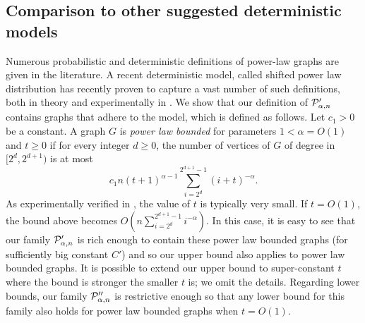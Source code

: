 \subsection{Comparison to other suggested deterministic models}
Numerous probabilistic and  deterministic  definitions of power-law graphs are given in the literature.
A recent deterministic model, called  shifted power law distribution \cite{eom2011characterizing} has recently proven to capture a vast number of such definitions, both in theory and experimentally in \cite{Sankowski2016PowerLaw}.
We show that our definition of $ \mathcal{P}'_{\alpha,n}$ contains graphs that adhere to the model, which is defined as follows.
 Let $c_1 > 0$ be a constant. A graph $G$ is \emph{power law bounded} for parameters $1 < \alpha = O(1)$ and $t\geq 0$ if for every integer $d\geq 0$, the number of vertices of $G$ of degree in $[2^d,2^{d+1})$ is at most
\[
  c_1n(t+1)^{\alpha - 1}\sum_{i = 2^d}^{2^{d+1} - 1}(i+t)^{-\alpha}.
\]
As experimentally verified in \cite{Sankowski2016PowerLaw}, the value of $t$ is typically very small. If $t = O(1)$, the bound above becomes $O(n\sum_{i = 2^d}^{2^{d+1} - 1}i^{-\alpha})$. In this case, it is easy to see that our family $ \mathcal{P}'_{\alpha,n}$ is rich enough to contain these power law bounded graphs (for sufficiently big constant $C'$) and so our upper bound also applies to power law bounded graphs. It is possible to extend our upper bound to super-constant $t$ where the bound is stronger the smaller $t$ is; we omit the details. Regarding lower bounds, our family $ \mathcal{P}''_{\alpha,n}$ is restrictive enough so that any lower bound for this family also holds for power law bounded graphs when $t = O(1)$.




